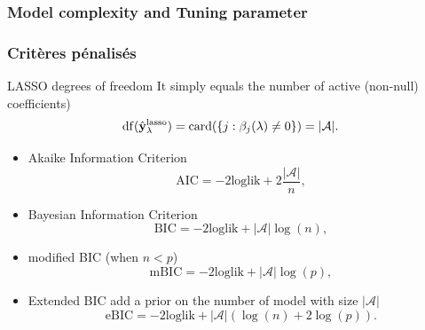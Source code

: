 \documentclass[10pt, c, xcolor=x11names]{beamer}\usepackage[]{graphicx}\usepackage[]{color}
\begin{document}
\subsubsection{Model complexity and Tuning parameter}

\begin{frame}
  \frametitle{Critères pénalisés}

  \begin{block}{LASSO degrees of freedom}
    It simply equals the number of active (non-null) coefficients)
\[
\mathrm{df}(\hat{\mathbf{y}}_\lambda^{\text{lasso}}) = \mathrm{card}(\left\{j:\beta_j(\lambda)\neq 0\right\}) = |\mathcal{A}|.
\]
  \end{block}

  \begin{itemize}
    \item \alert{Akaike Information Criterion} 
        \begin{equation*}
          \mathrm{AIC} = -2 \mathrm{loglik} + 2\frac{|\mathcal{A}|}{n},
        \end{equation*}
      \item \alert{Bayesian   Information   Criterion}
        \begin{equation*}
          \mathrm{BIC} = -2\mathrm{loglik} + |\mathcal{A}|\log(n),
        \end{equation*}
      \item \alert{modified BIC} (when $n < p$)
        \begin{equation*}
          \mathrm{mBIC} = -2\mathrm{loglik} + |\mathcal{A}|\log(p),
        \end{equation*}
      \item \alert{Extended BIC} add a prior on the number of model with size  $|\mathcal{A}|$
        \begin{equation*}
          \mathrm{eBIC} = -2\mathrm{loglik} + |\mathcal{A}|(\log(n) + 2\log(p)).
        \end{equation*}
      \end{itemize}
\end{frame}
\end{document}
